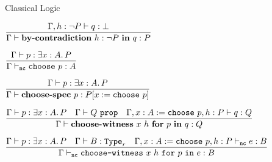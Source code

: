 \begin{frame}{Classical Logic}

\begin{center}
  $\infrule{\proves[\assume{\Gamma}{h}{\Not{P}}]{q}{\False}}{\proves[\Gamma]{\bycontradiction{h}[P]{q}}{P}}$

  \vspace{2em}

  $\infrule{\proves[\Gamma]{p}{\Ex{x}[A]{P}}}{\typing[\Gamma][\noncomputable]{\choose{p}}{A}}$

  \vspace{1em}

  $\infrule{\proves{p}{\Ex{x}[A]{P}}}{\proves{\choosespec{p}}{\subst{P}{x}{\choose{p}}}}$

  \vspace{2em}

  $\infrule{\proves[\Gamma]{p}{\Ex{x}[A]{P}} \quad \prop{Q} \quad \proves[\assume{\extend{\Gamma}{x}{A}[\choose{p}]}{h}{P}]{q}{Q}}{\proves[\Gamma]{\choosewitnessl{x}{h}{p}{q}}{Q}}$

  \vspace{1em}

  $\infrule{\proves[\Gamma]{p}{\Ex{x}[A]{P}} \quad \type[\Gamma]{B}[r] \quad \typing[\assume{\extend{\Gamma}{x}{A}[\choose{p}]}{h}{P}][\noncomputable]{e}{B}}{\typing[\Gamma][\noncomputable]{\choosewitnessp{x}{h}{p}{e}}{B}}$

\end{center}

\end{frame}